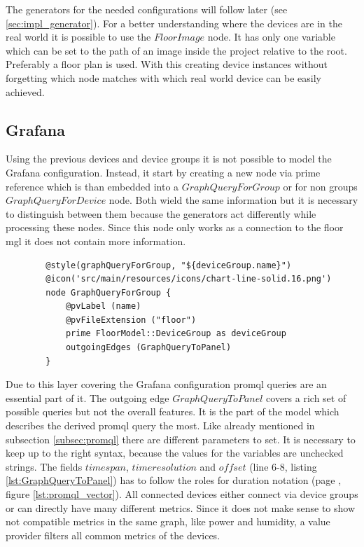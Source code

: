 The generators for the needed configurations will follow later (see \cref{sec:impl_generator}). For a better understanding where the devices are in the real world it is possible to use the $FloorImage$ node. It has only one variable which can be set to the path of an image inside the project relative to the root. Preferably a floor plan is used. With this creating device instances without forgetting which node matches with which real world device can be easily achieved.

\subsection{Grafana}

Using the previous devices and device groups it is not possible to model the Grafana configuration. Instead, it start by creating a new node via prime reference which is than embedded into a $GraphQueryForGroup$ or for non groups $GraphQueryForDevice$ node. Both wield the same information but it is necessary to distinguish between them because the generators act differently while processing these nodes. Since this node only works as a connection to the floor \gls{mgl} it does not contain more information. 

\begin{listing}[H]
	\begin{verbatim}
		@style(graphQueryForGroup, "${deviceGroup.name}")
		@icon('src/main/resources/icons/chart-line-solid.16.png')
		node GraphQueryForGroup {
			@pvLabel (name)
			@pvFileExtension ("floor")
			prime FloorModel::DeviceGroup as deviceGroup
			outgoingEdges (GraphQueryToPanel)
		}
	\end{verbatim}
\end{listing}

Due to this layer covering the Grafana configuration \gls{promql} queries are an essential part of it. The outgoing edge $GraphQueryToPanel$ covers a rich set of possible queries but not the overall features. It is the part of the model which describes the derived \gls{promql} query the most. Like already mentioned in subsection \ref{subsec:promql} there are different parameters to set. It is necessary to keep up to the right syntax, because the values for the variables are unchecked strings. The fields $timespan$, $timeresolution$ and $offset$ (line 6-8, listing \ref{lst:GraphQueryToPanel}) has to follow the roles for duration notation (page \pageref{lst:promql_vector}, figure \ref{lst:promql_vector}). All connected devices either connect via device groups or can directly have many different metrics. Since it does not make sense to show not compatible metrics in the same graph, like power and humidity, a value provider filters all common metrics of the devices. 

